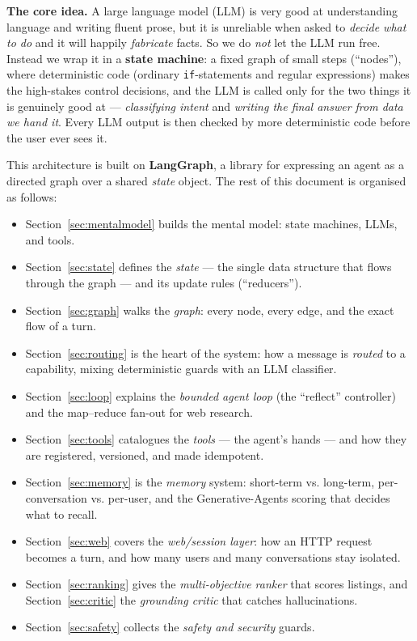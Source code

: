 \documentclass[11pt,a4paper]{article}
\newcommand{\code}[1]{\texttt{\small #1}}
\begin{document}
\begin{intuition}
\textbf{The core idea.} A large language model (LLM) is very good at understanding
language and writing fluent prose, but it is unreliable when asked to \emph{decide
what to do} and it will happily \emph{fabricate} facts. So we do \emph{not} let the
LLM run free. Instead we wrap it in a \textbf{state machine}: a fixed graph of small
steps (``nodes''), where deterministic code (ordinary \code{if}-statements and
regular expressions) makes the high-stakes control decisions, and the LLM is called
only for the two things it is genuinely good at --- \emph{classifying intent} and
\emph{writing the final answer from data we hand it}. Every LLM output is then
checked by more deterministic code before the user ever sees it.
\end{intuition}

This architecture is built on \textbf{LangGraph}, a library for expressing an agent
as a directed graph over a shared \emph{state} object. The rest of this document is
organised as follows:

\begin{itemize}[leftmargin=1.4em]
  \item Section~\ref{sec:mentalmodel} builds the mental model: state machines,
        LLMs, and tools.
  \item Section~\ref{sec:state} defines the \emph{state} --- the single data
        structure that flows through the graph --- and its update rules (``reducers'').
  \item Section~\ref{sec:graph} walks the \emph{graph}: every node, every edge,
        and the exact flow of a turn.
  \item Section~\ref{sec:routing} is the heart of the system: how a message is
        \emph{routed} to a capability, mixing deterministic guards with an LLM
        classifier.
  \item Section~\ref{sec:loop} explains the \emph{bounded agent loop} (the
        ``reflect'' controller) and the map--reduce fan-out for web research.
  \item Section~\ref{sec:tools} catalogues the \emph{tools} --- the agent's hands ---
        and how they are registered, versioned, and made idempotent.
  \item Section~\ref{sec:memory} is the \emph{memory} system: short-term vs.
        long-term, per-conversation vs. per-user, and the Generative-Agents scoring
        that decides what to recall.
  \item Section~\ref{sec:web} covers the \emph{web/session layer}: how an HTTP
        request becomes a turn, and how many users and many conversations stay
        isolated.
  \item Section~\ref{sec:ranking} gives the \emph{multi-objective ranker} that
        scores listings, and Section~\ref{sec:critic} the \emph{grounding critic}
        that catches hallucinations.
  \item Section~\ref{sec:safety} collects the \emph{safety and security} guards.
\end{itemize}
\end{document}
